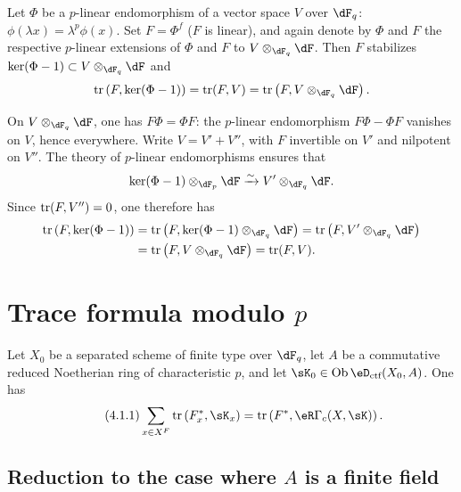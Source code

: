 \begin{lemma_}\label{III:3-8}
Let $\Phi$ be a $p$-linear endomorphism of a vector space $V$ over
$\dF_q$: $\phi(\lambda x) = \lambda^p\phi(x)$. Set $F=\Phi^f$ ($F$ is
linear), and again denote by $\Phi$ and $F$ the respective $p$-linear
extensions of $\Phi$ and $F$ to $V\otimes_{\dF_q}\dF$. Then $F$ stabilizes
$\ker(\Phi-1)\subset V\otimes_{\dF_q}\dF$ and
\[
  \tr\left(F,\ker(\Phi-1)\right) = \tr(F,V) = \tr\left(F,V\otimes_{\dF_q}\dF\right) \text{.}
\]
\end{lemma_}

On $V\otimes_{\dF_q}\dF$, one has $F\Phi = \Phi F$: the $p$-linear
endomorphism $F\Phi-\Phi F$ vanishes on $V$, hence everywhere. Write
$V=V'+V''$, with $F$ invertible on $V'$ and nilpotent on $V''$. The theory
of $p$-linear endomorphisms ensures that
\[
  \ker(\Phi-1)\otimes_{\dF_p}\dF \iso V'\otimes_{\dF_q}\dF \text{.}
\]
Since $\operatorname{tr}(F,V'') = 0$, one therefore has
\begin{align*}
  \tr\left(F,\ker(\Phi-1)\right)
    &= \tr\left(F,\ker(\Phi-1)\otimes_{\dF_q}\dF\right) = \tr\left(F,V'\otimes_{\dF_q}\dF\right) \\
    &= \tr\left(F,V\otimes_{\dF_q}\dF\right) = \tr(F,V) \text{.}
\end{align*}











\section{Trace formula modulo \texorpdfstring{$p$}{p}}\label{III:4}






\begin{theorem_}\label{III:4-1}
Let $X_0$ be a separated scheme of finite type over $\dF_q$, let $A$ be a
commutative reduced Noetherian ring of characteristic $p$, and let
$\sK_0\in\ob\eD_\textnormal{ctf}(X_0,A)$. One has
\begin{equation*}\tag{4.1.1}\label{III:eq:4-1-1}
  \sum_{x\in X^F} \tr\left(F_x^*,\sK_x\right) = \tr\left(F^*,\eR\Gamma_c(X,\sK)\right) \text{.}
\end{equation*}
\end{theorem_}






\subsection{Reduction to the case where \texorpdfstring{$A$}{A} is a finite field}\label{III:4-2}

